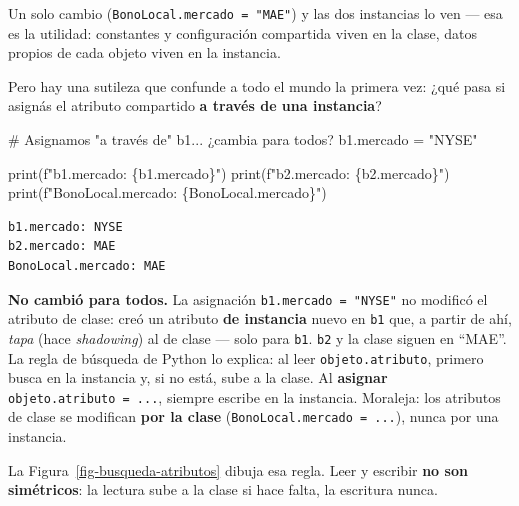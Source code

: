 \documentclass[
  spanish,
  letterpaper,
  DIV=11,
  numbers=noendperiod]{scrreprt}
\newenvironment{Shaded}{\begin{snugshade}}{\end{snugshade}}
\newcommand{\BuiltInTok}[1]{\textcolor[rgb]{0.00,0.23,0.31}{#1}}
\newcommand{\CommentTok}[1]{\textcolor[rgb]{0.37,0.37,0.37}{#1}}
\newcommand{\NormalTok}[1]{\textcolor[rgb]{0.00,0.23,0.31}{#1}}
\newcommand{\OperatorTok}[1]{\textcolor[rgb]{0.37,0.37,0.37}{#1}}
\newcommand{\SpecialCharTok}[1]{\textcolor[rgb]{0.37,0.37,0.37}{#1}}
\newcommand{\SpecialStringTok}[1]{\textcolor[rgb]{0.13,0.47,0.30}{#1}}
\newcommand{\StringTok}[1]{\textcolor[rgb]{0.13,0.47,0.30}{#1}}
\begin{document}
Un solo cambio (\texttt{BonoLocal.mercado\ =\ "MAE"}) y las dos
instancias lo ven --- esa es la utilidad: constantes y configuración
compartida viven en la clase, datos propios de cada objeto viven en la
instancia.

Pero hay una sutileza que confunde a todo el mundo la primera vez: ¿qué
pasa si asignás el atributo compartido \textbf{a través de una
instancia}?

\label{atributos-shadowing}
\begin{Shaded}
\begin{Highlighting}[]
\CommentTok{\# Asignamos "a través de" b1... ¿cambia para todos?}
\NormalTok{b1.mercado }\OperatorTok{=} \StringTok{"NYSE"}

\BuiltInTok{print}\NormalTok{(}\SpecialStringTok{f"b1.mercado: }\SpecialCharTok{\{}\NormalTok{b1}\SpecialCharTok{.}\NormalTok{mercado}\SpecialCharTok{\}}\SpecialStringTok{"}\NormalTok{)}
\BuiltInTok{print}\NormalTok{(}\SpecialStringTok{f"b2.mercado: }\SpecialCharTok{\{}\NormalTok{b2}\SpecialCharTok{.}\NormalTok{mercado}\SpecialCharTok{\}}\SpecialStringTok{"}\NormalTok{)}
\BuiltInTok{print}\NormalTok{(}\SpecialStringTok{f"BonoLocal.mercado: }\SpecialCharTok{\{}\NormalTok{BonoLocal}\SpecialCharTok{.}\NormalTok{mercado}\SpecialCharTok{\}}\SpecialStringTok{"}\NormalTok{)}
\end{Highlighting}
\end{Shaded}

\begin{verbatim}
b1.mercado: NYSE
b2.mercado: MAE
BonoLocal.mercado: MAE
\end{verbatim}

\textbf{No cambió para todos.} La asignación
\texttt{b1.mercado\ =\ "NYSE"} no modificó el atributo de clase: creó un
atributo \textbf{de instancia} nuevo en \texttt{b1} que, a partir de
ahí, \emph{tapa} (hace \emph{shadowing}) al de clase --- solo para
\texttt{b1}. \texttt{b2} y la clase siguen en ``MAE''. La regla de
búsqueda de Python lo explica: al leer \texttt{objeto.atributo}, primero
busca en la instancia y, si no está, sube a la clase. Al
\textbf{asignar} \texttt{objeto.atributo\ =\ ...}, siempre escribe en la
instancia. Moraleja: los atributos de clase se modifican \textbf{por la
clase} (\texttt{BonoLocal.mercado\ =\ ...}), nunca por una instancia.

La Figura~\ref{fig-busqueda-atributos} dibuja esa regla. Leer y escribir
\textbf{no son simétricos}: la lectura sube a la clase si hace falta, la
escritura nunca.
\end{document}
